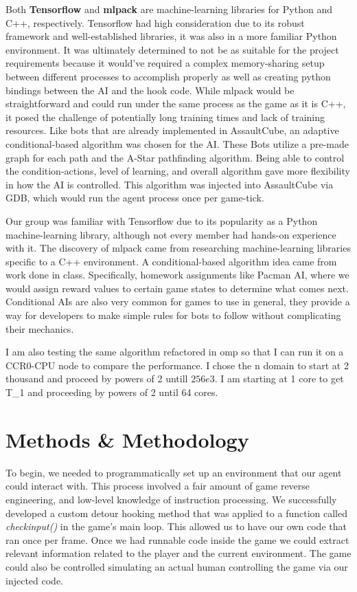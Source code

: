 \documentclass[11pt,a4paper]{article}
\begin{document}
Both \textbf{Tensorflow} and \textbf{mlpack} are machine-learning libraries for Python and C++, respectively. Tensorflow had high consideration due to its robust framework and well-established libraries, it was also in a more familiar Python environment. It was ultimately determined to not be as suitable for the project requirements because it would’ve required a complex memory-sharing setup between different processes to accomplish properly as well as creating python bindings between the AI and the hook code. While mlpack would be straightforward and could run under the same process as the game as it is C++, it posed the challenge of potentially long training times and lack of training resources. Like bots that are already implemented in AssaultCube, an adaptive conditional-based algorithm was chosen for the AI. These Bots utilize a pre-made graph for each path and the A-Star pathfinding algorithm. Being able to control the condition-actions, level of learning, and overall algorithm gave more flexibility in how the AI is controlled. This algorithm was injected into AssaultCube via GDB, which would run the agent process once per game-tick.

Our group was familiar with Tensorflow due to its popularity as a Python machine-learning library, although not every member had hands-on experience with it. The discovery of mlpack came from researching machine-learning libraries specific to a C++ environment. A conditional-based algorithm idea came from work done in class. Specifically, homework assignments like Pacman AI, where we would assign reward values to certain game states to determine what comes next. Conditional AIs are also very common for games to use in general, they provide a way for developers to make simple rules for bots to follow without complicating their mechanics.

I am also testing the same algorithm refactored in omp so that I can run it on a CCR0-CPU node to compare the performance. I chose the n domain to start at 2 thousand and proceed by powers of 2 untill $256e3$. I am starting at 1 core to get T\_1 and proceeding by powers of 2 until 64 cores.

\section{Methods \& Methodology}
To begin, we needed to programmatically set up an environment that our agent could interact with. This process involved a fair amount of game reverse engineering, and low-level knowledge of instruction processing. We successfully developed a custom detour hooking method that was applied to a function called \textit{checkinput()} in the game’s main loop. This allowed us to have our own code that ran once per frame. Once we had runnable code inside the game we could extract relevant information related to the player and the current environment. The game could also be controlled simulating an actual human controlling the game via our injected code. 
\end{document}
